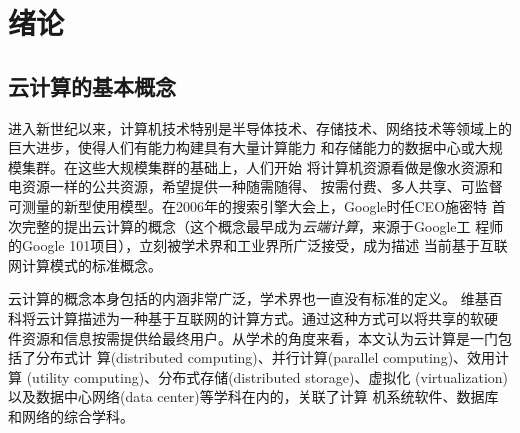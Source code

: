 \chapter{绪论}
\label{chap:introduction}

\section{云计算的基本概念}

进入新世纪以来，计算机技术特别是半导体技术、存储技术、网络技术等领域上的巨大进步，使得人们有能力构建具有大量计算能力
和存储能力的数据中心或大规模集群。在这些大规模集群的基础上，人们开始
将计算机资源看做是像水资源和电资源一样的公共资源，希望提供一种随需随得、
按需付费、多人共享、可监督可测量的新型使用模型。在2006年的搜索引擎大会上，Google时任CEO施密特
首次完整的提出云计算的概念（这个概念最早成为\textit{云端计算}，来源于Google工
程师的Google 101项目），立刻被学术界和工业界所广泛接受，成为描述
当前基于互联网计算模式的标准概念。

云计算的概念本身包括的内涵非常广泛，学术界也一直没有标准的定义。
维基百科将云计算\cite{cloudcomputing}描述为一种基于互联网的计算方式。通过这种方式可以将共享的软硬
件资源和信息按需提供给最终用户。从学术的角度来看，本文认为云计算是一门包括了分布式计
算(distributed computing)、并行计算(parallel computing)、效用计算
(utility computing)、分布式存储(distributed storage)、虚拟化
(virtualization)以及数据中心网络(data center)等学科在内的，关联了计算
机系统软件、数据库和网络的综合学科。

